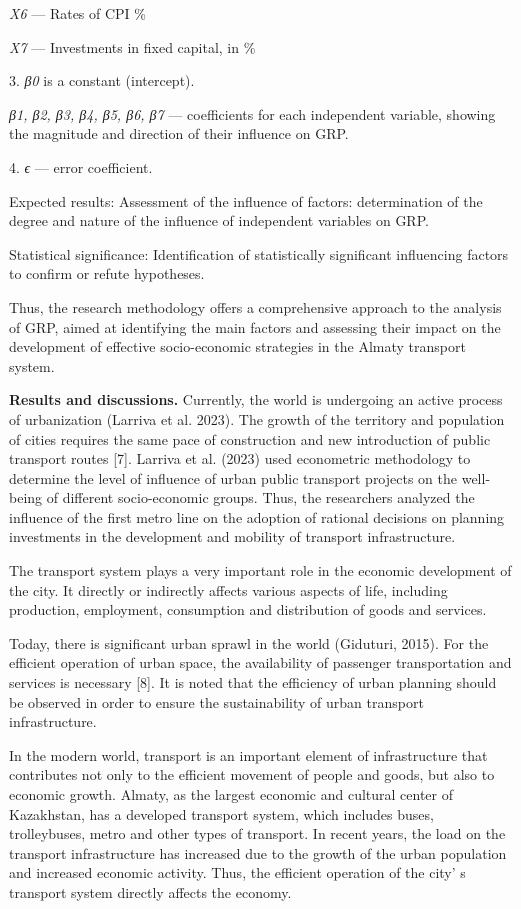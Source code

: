 \begin{multicols}{2}
\emph{X6} --- Rates of CPI \%

\emph{X7} --- Investments in fixed capital, in \%

3. \emph{β0} is a constant (intercept).

\emph{β1, β2, β3, β4, β5, β6, β7} --- coefficients for each independent
variable, showing the magnitude and direction of their influence on GRP.

4. \emph{ϵ} --- error coefficient.

Expected results: Assessment of the influence of factors: determination
of the degree and nature of the influence of independent variables on
GRP.

Statistical significance: Identification of statistically significant
influencing factors to confirm or refute hypotheses.

Thus, the research methodology offers a comprehensive approach to the
analysis of GRP, aimed at identifying the main factors and assessing
their impact on the development of effective socio-economic strategies
in the Almaty transport system.

{\bfseries Results and discussions.} Currently, the world is undergoing an
active process of urbanization (Larriva et al. 2023). The growth of the
territory and population of cities requires the same pace of
construction and new introduction of public transport routes {[}7{]}.
Larriva et al. (2023) used econometric methodology to determine the
level of influence of urban public transport projects on the well-being
of different socio-economic groups. Thus, the researchers analyzed the
influence of the first metro line on the adoption of rational decisions
on planning investments in the development and mobility of transport
infrastructure.

The transport system plays a very important role in the economic
development of the city. It directly or indirectly affects various
aspects of life, including production, employment, consumption and
distribution of goods and services.

Today, there is significant urban sprawl in the world (Giduturi, 2015).
For the efficient operation of urban space, the availability of
passenger transportation and services is necessary {[}8{]}. It is noted
that the efficiency of urban planning should be observed in order to
ensure the sustainability of urban transport infrastructure.

In the modern world, transport is an important element of infrastructure
that contributes not only to the efficient movement of people and goods,
but also to economic growth. Almaty, as the largest economic and
cultural center of Kazakhstan, has a developed transport system, which
includes buses, trolleybuses, metro and other types of transport. In
recent years, the load on the transport infrastructure has increased due
to the growth of the urban population and increased economic activity.
Thus, the efficient operation of the city' s transport
system directly affects the economy.


\end{multicols}
